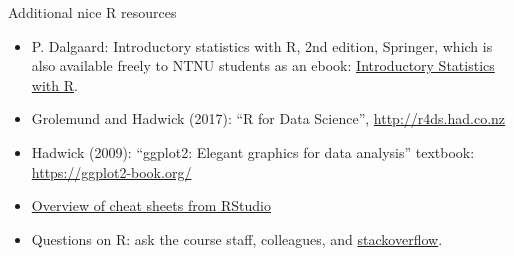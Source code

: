 \documentclass[10pt,ignorenonframetext,]{beamer}
\providecommand{\tightlist}{%
  \setlength{\itemsep}{0pt}\setlength{\parskip}{0pt}}
\begin{document}
\begin{frame}

\begin{block}{Additional nice R resources}

\vspace{3mm}

\begin{itemize}
\tightlist
\item
  P. Dalgaard: Introductory statistics with R, 2nd edition, Springer,
  which is also available freely to NTNU students as an ebook:
  \href{https://link.springer.com/book/10.1007/978-0-387-79054-1}{Introductory
  Statistics with R}.
\end{itemize}

\vspace{1mm}

\begin{itemize}
\tightlist
\item
  Grolemund and Hadwick (2017): ``R for Data Science'',
  \url{http://r4ds.had.co.nz}
\end{itemize}

\vspace{1mm}

\begin{itemize}
\tightlist
\item
  Hadwick (2009): ``ggplot2: Elegant graphics for data analysis''
  textbook: \url{https://ggplot2-book.org/}
\end{itemize}

\vspace{1mm}

\begin{itemize}
\tightlist
\item
  \href{https://www.rstudio.com/resources/cheatsheets/}{Overview of
  cheat sheets from RStudio}
\end{itemize}

\begin{itemize}
\tightlist
\item
  Questions on R: ask the course staff, colleagues, and
  \href{https://stackoverflow.com/}{stackoverflow}.
\end{itemize}

\end{block}

\end{frame}
\end{document}
